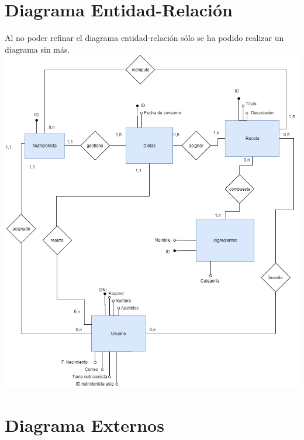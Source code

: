 \documentclass[12pt,letterpaper]{article}
\begin{document}
\section{Diagrama Entidad-Relación}
Al no poder refinar el diagrama entidad-relación sólo se ha podido realizar un diagrama sin más.\\
\includegraphics[scale=0.6]{entidad.png}
\newpage

\section{Diagrama Externos}
\end{document}
